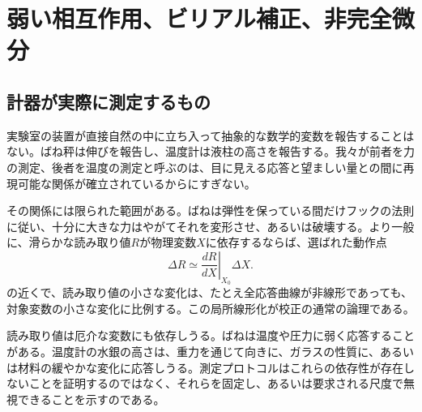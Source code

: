 \chapter{弱い相互作用、ビリアル補正、非完全微分}


\section{計器が実際に測定するもの}

実験室の装置が直接自然の中に立ち入って抽象的な数学的変数を報告することはない。ばね秤は伸びを報告し、温度計は液柱の高さを報告する。我々が前者を力の測定、後者を温度の測定と呼ぶのは、目に見える応答と望ましい量との間に再現可能な関係が確立されているからにすぎない。

その関係には限られた範囲がある。ばねは弾性を保っている間だけフックの法則に従い、十分に大きな力はやがてそれを変形させ、あるいは破壊する。より一般に、滑らかな読み取り値\(R\)が物理変数\(X\)に依存するならば、選ばれた動作点\begin{equation}
 \Delta R \simeq
 \left.\frac{dR}{dX}\right|_{X_0}\Delta X.
 \label{eq:sm6-local-linear-response}
\end{equation}の近くで、読み取り値の小さな変化は、たとえ全応答曲線が非線形であっても、対象変数の小さな変化に比例する。この局所線形化が校正の通常の論理である。

読み取り値は厄介な変数にも依存しうる。ばねは温度や圧力に弱く応答することがある。温度計の水銀の高さは、重力を通じて向きに、ガラスの性質に、あるいは材料の緩やかな変化に応答しうる。測定プロトコルはこれらの依存性が存在しないことを証明するのではなく、それらを固定し、あるいは要求される尺度で無視できることを示すのである。

\begin{classroomqa}
\end{classroomqa}

